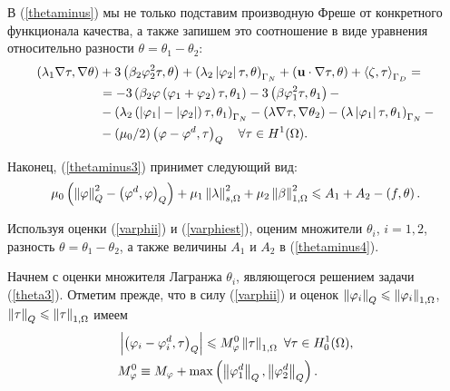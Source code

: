 В (\ref{thetaminus}) мы не только подставим производную Фреше от конкретного функционала качества, а также запишем это соотношение в виде уравнения относительно разности $\theta = \theta_1 - \theta_2$:
\begin{equation}
	\label{3.25arn}
	\begin{split}
		\left( \lambda_1 \nabla \tau, \nabla \theta \right) 
		&+ 3 \left( \beta_2 \varphi_2^2 \tau, \theta \right) 
		+ \left( \lambda_2 \left\vert \varphi_2 \right\vert \tau, \theta \right)_{\Gamma_N}
		+ \left( \mathbf{u} \cdot \nabla \tau, \theta \right) 
		+ \left\langle \zeta, \tau \right\rangle_{\Gamma_D} = \\
		&= - 3 \left( \beta_2 \varphi \left( \varphi_1 + \varphi_2 \right) \tau, \theta_1 \right)
		- 3 \left( \beta \varphi_1^2 \tau, \theta_1 \right) - \\
		&- \left( \lambda_2 
			\left( 
				\left\vert \varphi_1 \right\vert - \left\vert \varphi_2 \right\vert
			 \right) \tau, \theta_1
		 \right)_{\Gamma_N}
		- \left( \lambda \nabla \tau, \nabla \theta_2 \right) 
		- \left( \lambda \left\vert \varphi_1 \right\vert \tau, \theta_1 \right)_{\Gamma_N} - \\
		&- (\mu_0 / 2) \left( \varphi - \varphi^d, \tau \right)_Q \quad
		\forall \tau \in H^1 (\Omega).
	\end{split}
\end{equation}

Наконец, (\ref{thetaminus3}) принимет следующий вид:
\begin{equation}
	\label{thetaminus4}
	\mu_0 \left( \left\Vert \varphi \right\Vert^2_Q - \left( \varphi^d, \varphi \right)_Q  \right) + 
	\mu_1 \left\Vert \lambda \right\Vert^2_{s,\Omega} + 
	\mu_2 \left\Vert \beta \right\Vert^2_{1,\Omega} \leqslant A_1 + A_2 - \left( f, \theta \right).
\end{equation}

Используя оценки (\ref{varphii}) и (\ref{varphiest}), оценим множители $\theta_i$, $i=1,2$, разность $\theta = \theta_1 - \theta_2$, а также величины $A_1$ и $A_2$ в (\ref{thetaminus4}).

Начнем с оценки множителя Лагранжа $\theta_i$, являющегося решением задачи (\ref{theta3}). Отметим прежде, что в силу (\ref{varphii}) и оценок $\left\Vert \varphi_i \right\Vert_Q \leqslant \left\Vert \varphi_i \right\Vert_{1,\Omega}$, $\left\Vert \tau \right\Vert_Q \leqslant \left\Vert \tau \right\Vert_{1,\Omega}$ имеем
\begin{equation}
	\label{fi}
	\begin{split}
		&\left\vert  \left( \varphi_i - \varphi_i^d, \tau \right)_Q  \right\vert \leqslant M_\varphi^0 \left\Vert \tau \right\Vert_{1, \Omega} ~ \forall \tau \in H^1_0 (\Omega), \\
		&M_\varphi^0 \equiv M_\varphi + \max \left( \left\Vert \varphi_1^d \right\Vert_Q, \left\Vert \varphi_2^d \right\Vert_Q \right).
	\end{split}
\end{equation}

